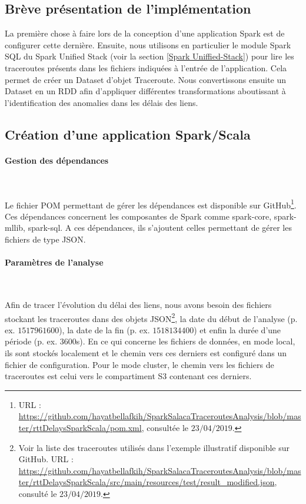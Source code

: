 \subsection{Brève présentation  de l'implémentation}

La première chose à faire lors de la conception d'une application Spark est de configurer cette dernière. Ensuite, nous utilisons en particulier le module  Spark SQL  du Spark Unified Stack (voir la section \ref{Spark Uniffied-Stack}) pour lire les traceroutes présents dans les fichiers indiquées à l'entrée de l'application. Cela permet de créer un Dataset d'objet Traceroute.  Nous convertissons ensuite un Dataset en un RDD afin d'appliquer différentes transformations aboutissant à l'identification des anomalies dans les délais des liens.

\subsection{Création d'une application Spark/Scala}

\paragraph{Gestion des dépendances}~

Le fichier POM permettant de gérer les dépendances est disponible sur GitHub\footnote{URL : \url{https://github.com/hayatbellafkih/SparkSalacaTraceroutesAnalysis/blob/master/rttDelaysSparkScala/pom.xml}, consultée le $23/04/2019$.}. Ces dépendances concernent les composantes de Spark comme spark-core, spark-mllib, spark-sql. A ces dépendances, ils s'ajoutent celles permettant de gérer les fichiers de type JSON. 

\paragraph{Paramètres de l'analyse}~

Afin de tracer l'évolution du délai des liens, nous avons besoin des fichiers stockant les  traceroutes  dans  des objets JSON\footnote{Voir la liste des traceroutes utilisés dans l'exemple illustratif disponible sur GitHub. URL : \url{https://github.com/hayatbellafkih/SparkSalacaTraceroutesAnalysis/blob/master/rttDelaysSparkScala/src/main/resources/test/result_modified.json}, consulté le $23/04/2019$.}, la date du début de l'analyse (p. ex. $ 1517961600 $), la date de la fin (p. ex. $ 1518134400 $) et enfin la durée d'une période (p. ex. $3600$s). En ce qui concerne les fichiers de données, en mode local, ils sont stockés localement et le chemin vers ces derniers est configuré dans un fichier de configuration. Pour le mode cluster, le chemin vers les fichiers de traceroutes est celui vers le compartiment S3 contenant ces derniers.

